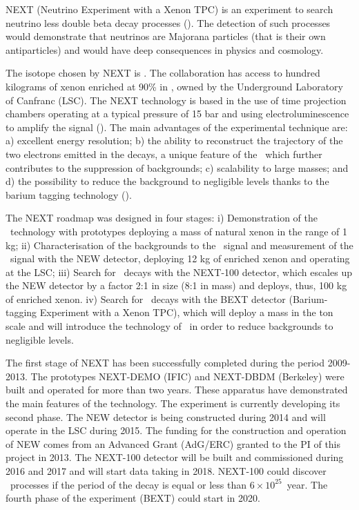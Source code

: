 
NEXT (Neutrino Experiment with a Xenon TPC) is an experiment to search neutrino less double beta decay processes (\bbonu). The detection of such processes would demonstrate that neutrinos are Majorana particles (that is their own antiparticles) and would have deep consequences in physics and cosmology.  

The isotope chosen by NEXT is  \XE. The collaboration has access to hundred kilograms of xenon enriched at 90\% in \XE, owned by the Underground Laboratory of Canfranc (LSC). The NEXT technology is based in the use of time projection chambers operating at a typical pressure of 15 bar and using electroluminescence to amplify the signal (\HPXE). The main advantages of the experimental technique are: a) excellent energy resolution; b) the ability to reconstruct the trajectory of the two electrons emitted in the decays, a unique feature of the \HPXE\ which further contributes to the suppression of backgrounds; c) scalability to large masses; and d) the possibility to reduce the background to negligible levels thanks to the barium tagging technology (\BATA).

The NEXT roadmap was designed in four stages: i) Demonstration of the \HPXE\ technology with prototypes deploying a mass of natural xenon in the range of 1 kg; ii) Characterisation of the backgrounds to the \bbonu\ signal and measurement of the \bbtnu\ signal with the NEW detector, deploying 12 kg of enriched xenon and operating at the LSC; iii) Search for \bbonu\ decays with the NEXT-100 detector, which escales up the NEW detector by a factor 2:1 in size (8:1 in mass) and deploys, thus, 100 kg of enriched xenon. iv) Search for \bbonu\ decays with the BEXT detector (Barium-tagging Experiment with a Xenon TPC), which will deploy a mass in the ton scale and will introduce the technology of \BATA\ in order to reduce backgrounds to negligible levels.  

The first stage of NEXT has been successfully completed during the period 2009-2013. The prototypes NEXT-DEMO (IFIC) and NEXT-DBDM (Berkeley) were built and operated for more than two years. These apparatus have demonstrated the main features of the technology. The experiment is currently developing its second phase. The NEW detector is being constructed during 2014 and will operate in the LSC during 2015. The funding for the construction and operation of NEW comes from an Advanced Grant (AdG/ERC) granted to the PI of this project in 2013. The NEXT-100 detector will be built and commissioned during 2016 and 2017 and will start data taking in 2018. NEXT-100 could discover \bbonu\ processes if the period of the decay is equal or less than $6 \times 10^{25}$~year. The fourth phase of the experiment (BEXT) could start in 2020. 

